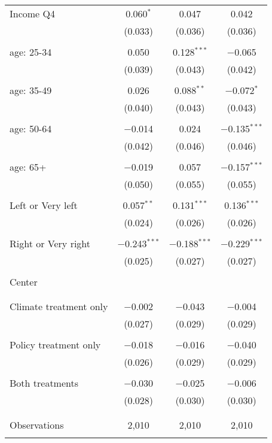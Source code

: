\begin{tabular}{@{\extracolsep{5pt}}lccc}
 Income Q4 & 0.060$^{*}$ & 0.047 & 0.042 \\ 
  & (0.033) & (0.036) & (0.036) \\ 
  & & & \\ 
 age: 25-34 & 0.050 & 0.128$^{***}$ & $-$0.065 \\ 
  & (0.039) & (0.043) & (0.042) \\ 
  & & & \\ 
 age: 35-49 & 0.026 & 0.088$^{**}$ & $-$0.072$^{*}$ \\ 
  & (0.040) & (0.043) & (0.043) \\ 
  & & & \\ 
 age: 50-64 & $-$0.014 & 0.024 & $-$0.135$^{***}$ \\ 
  & (0.042) & (0.046) & (0.046) \\ 
  & & & \\ 
 age: 65+ & $-$0.019 & 0.057 & $-$0.157$^{***}$ \\ 
  & (0.050) & (0.055) & (0.055) \\ 
  & & & \\ 
 Left or Very left & 0.057$^{**}$ & 0.131$^{***}$ & 0.136$^{***}$ \\ 
  & (0.024) & (0.026) & (0.026) \\ 
  & & & \\ 
 Right or Very right & $-$0.243$^{***}$ & $-$0.188$^{***}$ & $-$0.229$^{***}$ \\ 
  & (0.025) & (0.027) & (0.027) \\ 
  & & & \\ 
 Center &  &  &  \\ 
  &  &  &  \\ 
  & & & \\ 
 Climate treatment only & $-$0.002 & $-$0.043 & $-$0.004 \\ 
  & (0.027) & (0.029) & (0.029) \\ 
  & & & \\ 
 Policy treatment only & $-$0.018 & $-$0.016 & $-$0.040 \\ 
  & (0.026) & (0.029) & (0.029) \\ 
  & & & \\ 
 Both treatments & $-$0.030 & $-$0.025 & $-$0.006 \\ 
  & (0.028) & (0.030) & (0.030) \\ 
  & & & \\ 
\hline \\[-1.8ex] 

Observations & 2,010 & 2,010 & 2,010 \\ 
\hline 
\hline \\[-1.8ex] 
\end{tabular} 